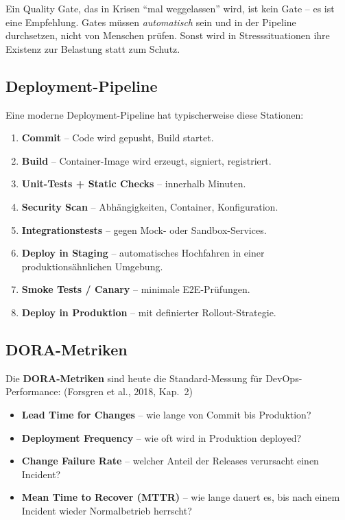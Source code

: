 \documentclass[11pt,a4paper,oneside]{article}
\newcommand{\fachbegriff}[1]{\textbf{#1}}
\newcommand{\quelle}[1]{{\footnotesize\color{lpGray}(#1)}}
\begin{document}
\begin{merkbox}
Ein Quality Gate, das in Krisen ``mal weggelassen'' wird, ist kein Gate -- es ist eine Empfehlung. Gates müssen \emph{automatisch} sein und in der Pipeline durchsetzen, nicht von Menschen prüfen. Sonst wird in Stresssituationen ihre Existenz zur Belastung statt zum Schutz.
\end{merkbox}

\subsection{Deployment-Pipeline}

Eine moderne Deployment-Pipeline hat typischerweise diese Stationen:

\begin{enumerate}
  \item \textbf{Commit} -- Code wird gepusht, Build startet.
  \item \textbf{Build} -- Container-Image wird erzeugt, signiert, registriert.
  \item \textbf{Unit-Tests + Static Checks} -- innerhalb Minuten.
  \item \textbf{Security Scan} -- Abhängigkeiten, Container, Konfiguration.
  \item \textbf{Integrationstests} -- gegen Mock- oder Sandbox-Services.
  \item \textbf{Deploy in Staging} -- automatisches Hochfahren in einer produktionsähnlichen Umgebung.
  \item \textbf{Smoke Tests / Canary} -- minimale E2E-Prüfungen.
  \item \textbf{Deploy in Produktion} -- mit definierter Rollout-Strategie.
\end{enumerate}

\subsection{DORA-Metriken}

Die \fachbegriff{DORA-Metriken} sind heute die Standard-Messung für DevOps-Performance: \quelle{Forsgren et al., 2018, Kap.~2}

\begin{itemize}
  \item \fachbegriff{Lead Time for Changes} -- wie lange von Commit bis Produktion?
  \item \fachbegriff{Deployment Frequency} -- wie oft wird in Produktion deployed?
  \item \fachbegriff{Change Failure Rate} -- welcher Anteil der Releases verursacht einen Incident?
  \item \fachbegriff{Mean Time to Recover (MTTR)} -- wie lange dauert es, bis nach einem Incident wieder Normalbetrieb herrscht?
\end{itemize}
\end{document}
